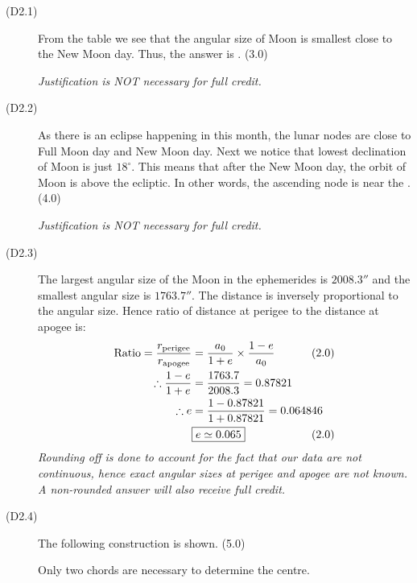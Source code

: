 \begin{description}
\item[(D2.1)]
From the table we see that the angular size of Moon is smallest close to the New Moon day.
Thus, the answer is . \hfill(3.0)

\emph{Justification is NOT necessary for full credit.}

\item[(D2.2)]
As there is an eclipse happening in this month, the lunar nodes are close to Full Moon day
and New Moon day. Next we notice that lowest declination of Moon is just $18^\circ$. This
means that after the New Moon day, the orbit of Moon is above the ecliptic. In other words,
the ascending node is near the . \hfill(4.0)

\emph{Justification is NOT necessary for full credit.}

\item[(D2.3)]
The largest angular size of the Moon in the ephemerides is $2008.3''$ and the smallest
angular size is $1763.7''$. The distance is inversely proportional to the angular size. Hence
ratio of distance at perigee to the distance at apogee is:
\begin{align*}
\mathrm{Ratio} = \frac{r_{\mathrm{perigee}}}{r_{\mathrm{apogee}}}
 &= \frac{a_0}{1+e}\times\frac{1-e}{a_0}
 & &\hspace{-2em}(2.0)\\
\therefore \frac{1-e}{1+e} &= \frac{1763.7}{2008.3} = 0.87821\\
\therefore e &= \frac{1 - 0.87821}{1 + 0.87821} = 0.064846\\
&\fbox{$e \simeq 0.065$}
 & &\hspace{-2em}(2.0)
\end{align*}
\emph{Rounding off is done to account for the fact that our data are not continuous, hence
exact angular sizes at perigee and apogee are not known. A non-rounded answer will also
receive full credit.}

\item[(D2.4)]
The following construction is shown. \hfill(5.0)

Only two chords are necessary to determine the centre.


\end{description}
